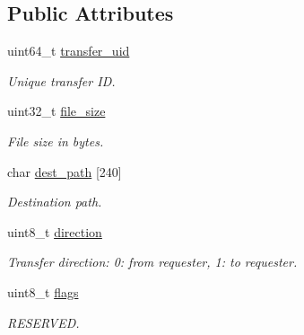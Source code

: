 \subsection*{Public Attributes}
\begin{DoxyCompactItemize}
\item 
\hypertarget{struct____mavlink__file__transfer__start__t_a7c0e14ae134e2c92f6e7f688076bac3d}{uint64\+\_\+t \hyperlink{struct____mavlink__file__transfer__start__t_a7c0e14ae134e2c92f6e7f688076bac3d}{transfer\+\_\+uid}}\label{struct____mavlink__file__transfer__start__t_a7c0e14ae134e2c92f6e7f688076bac3d}

\begin{DoxyCompactList}\small\item\em Unique transfer I\+D. \end{DoxyCompactList}\item 
\hypertarget{struct____mavlink__file__transfer__start__t_a4bea17bbd0067dc18ac515c29be14bbe}{uint32\+\_\+t \hyperlink{struct____mavlink__file__transfer__start__t_a4bea17bbd0067dc18ac515c29be14bbe}{file\+\_\+size}}\label{struct____mavlink__file__transfer__start__t_a4bea17bbd0067dc18ac515c29be14bbe}

\begin{DoxyCompactList}\small\item\em File size in bytes. \end{DoxyCompactList}\item 
\hypertarget{struct____mavlink__file__transfer__start__t_ad6e81340d374e8fa65a8bb7a9f3f6602}{char \hyperlink{struct____mavlink__file__transfer__start__t_ad6e81340d374e8fa65a8bb7a9f3f6602}{dest\+\_\+path} \mbox{[}240\mbox{]}}\label{struct____mavlink__file__transfer__start__t_ad6e81340d374e8fa65a8bb7a9f3f6602}

\begin{DoxyCompactList}\small\item\em Destination path. \end{DoxyCompactList}\item 
\hypertarget{struct____mavlink__file__transfer__start__t_a28d4f521802039ee5b22607b578c6d65}{uint8\+\_\+t \hyperlink{struct____mavlink__file__transfer__start__t_a28d4f521802039ee5b22607b578c6d65}{direction}}\label{struct____mavlink__file__transfer__start__t_a28d4f521802039ee5b22607b578c6d65}

\begin{DoxyCompactList}\small\item\em Transfer direction\+: 0\+: from requester, 1\+: to requester. \end{DoxyCompactList}\item 
\hypertarget{struct____mavlink__file__transfer__start__t_aaeefe499ca015700989b21a6e9533935}{uint8\+\_\+t \hyperlink{struct____mavlink__file__transfer__start__t_aaeefe499ca015700989b21a6e9533935}{flags}}\label{struct____mavlink__file__transfer__start__t_aaeefe499ca015700989b21a6e9533935}

\begin{DoxyCompactList}\small\item\em R\+E\+S\+E\+R\+V\+E\+D. \end{DoxyCompactList}\end{DoxyCompactItemize}


